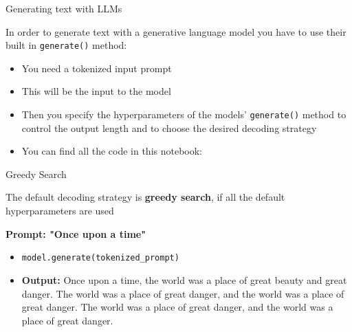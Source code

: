 \documentclass[11pt,compress,t,notes=noshow, xcolor=table]{beamer}
\begin{document}


\begin{frame}{Generating text with LLM\MakeLowercase{s}}

\vfill

In order to generate text with a generative language model you have to use their built in \texttt{generate()} method: 

\vfill

\begin{itemize}
    \item You need a tokenized input prompt
    \item This will be the input to the model 
    \item Then you specify the hyperparameters of the models' \texttt{generate()} method to control the output length and to choose the desired decoding strategy
    \item You can find all the code in this notebook: 
\end{itemize}

\vfill
    
\end{frame}


\begin{vbframe}{Greedy Search}

\vfill

The default decoding strategy is \textbf{greedy search}, if all the default hyperparameters are used

\textbf{Prompt: "Once upon a time"}

\begin{itemize}
    \item \texttt{model.generate(tokenized\_prompt)}
    \item \textbf{Output:} Once upon a time, the world was a place of great beauty and great danger. The world was a place of great danger, and the world was a place of great danger. The world was a place of great danger, and the world was a place of great danger.
\end{itemize}

\vfill
    
\end{vbframe}
\end{document}
